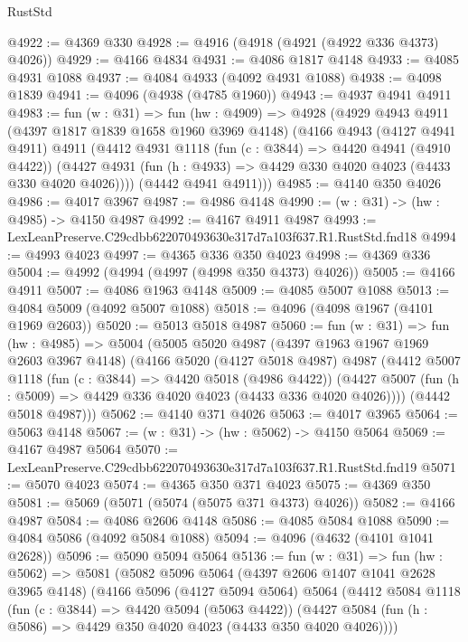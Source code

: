 \begin{lexlean}{RustStd}
\begin{coremodule}
@4922 := @4369 @330
@4928 := @4916 (@4918 (@4921 (@4922 @336 @4373) @4026))
@4929 := @4166 @4834
@4931 := @4086 @1817 @4148
@4933 := @4085 @4931 @1088
@4937 := @4084 @4933 (@4092 @4931 @1088)
@4938 := @4098 @1839
@4941 := @4096 (@4938 (@4785 @1960))
@4943 := @4937 @4941 @4911
@4983 := fun (w : @31) =>
  fun (hw : @4909) =>
  @4928
    (@4929
      @4943
      @4911
      (@4397 @1817 @1839 @1658 @1960 @3969 @4148)
      (@4166
        @4943
        (@4127 @4941 @4911)
        @4911
        (@4412
          @4931
          @1118
          (fun (c : @3844) => @4420 @4941 (@4910 @4422))
          (@4427 @4931 (fun (h : @4933) => @4429 @330 @4020 @4023 (@4433 @330 @4020 @4026))))
        (@4442 @4941 @4911)))
@4985 := @4140 @350 @4026
@4986 := @4017 @3967
@4987 := @4986 @4148
@4990 := (w : @31) -> (hw : @4985) -> @4150 @4987
@4992 := @4167 @4911 @4987
@4993 := LexLeanPreserve.C29cdbb622070493630e317d7a103f637.R1.RustStd.fnd18
@4994 := @4993 @4023
@4997 := @4365 @336 @350 @4023
@4998 := @4369 @336
@5004 := @4992 (@4994 (@4997 (@4998 @350 @4373) @4026))
@5005 := @4166 @4911
@5007 := @4086 @1963 @4148
@5009 := @4085 @5007 @1088
@5013 := @4084 @5009 (@4092 @5007 @1088)
@5018 := @4096 (@4098 @1967 (@4101 @1969 @2603))
@5020 := @5013 @5018 @4987
@5060 := fun (w : @31) =>
  fun (hw : @4985) =>
  @5004
    (@5005
      @5020
      @4987
      (@4397 @1963 @1967 @1969 @2603 @3967 @4148)
      (@4166
        @5020
        (@4127 @5018 @4987)
        @4987
        (@4412
          @5007
          @1118
          (fun (c : @3844) => @4420 @5018 (@4986 @4422))
          (@4427 @5007 (fun (h : @5009) => @4429 @336 @4020 @4023 (@4433 @336 @4020 @4026))))
        (@4442 @5018 @4987)))
@5062 := @4140 @371 @4026
@5063 := @4017 @3965
@5064 := @5063 @4148
@5067 := (w : @31) -> (hw : @5062) -> @4150 @5064
@5069 := @4167 @4987 @5064
@5070 := LexLeanPreserve.C29cdbb622070493630e317d7a103f637.R1.RustStd.fnd19
@5071 := @5070 @4023
@5074 := @4365 @350 @371 @4023
@5075 := @4369 @350
@5081 := @5069 (@5071 (@5074 (@5075 @371 @4373) @4026))
@5082 := @4166 @4987
@5084 := @4086 @2606 @4148
@5086 := @4085 @5084 @1088
@5090 := @4084 @5086 (@4092 @5084 @1088)
@5094 := @4096 (@4632 (@4101 @1041 @2628))
@5096 := @5090 @5094 @5064
@5136 := fun (w : @31) =>
  fun (hw : @5062) =>
  @5081
    (@5082
      @5096
      @5064
      (@4397 @2606 @1407 @1041 @2628 @3965 @4148)
      (@4166
        @5096
        (@4127 @5094 @5064)
        @5064
        (@4412
          @5084
          @1118
          (fun (c : @3844) => @4420 @5094 (@5063 @4422))
          (@4427 @5084 (fun (h : @5086) => @4429 @350 @4020 @4023 (@4433 @350 @4020 @4026))))

\end{coremodule}
\end{lexlean}
